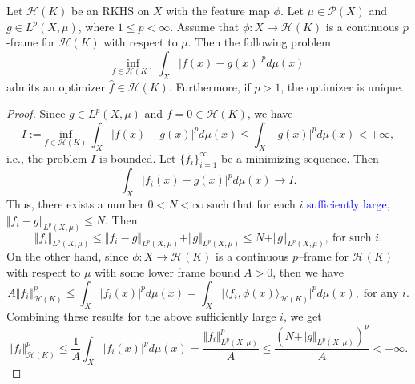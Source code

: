 \documentclass[10pt,a4paper]{amsart}
\begin{document}
\begin{theorem} \label{pexistance} 
  Let $\mathscr{H}(K)$ be an RKHS on $X$ with the feature map $\phi$.  
  Let $\mu \in \mathscr{P}(X)$ and $g \in L^p(X,\mu)$, where $1 \leq p<\infty$.
  Assume that $\phi: X \rightarrow \mathscr{H}(K)$ is a continuous $p$-frame for $\mathscr{H}(K)$ with respect to $\mu$. 
  Then the following problem 
    \begin{equation*}\label{muPNorm}
    \underset{f \in \mathscr{H}(K)}{\text{inf}} \ \int_{X} \vert f(x) - g(x) \vert ^p d\mu(x)
\end{equation*}
admits an optimizer $\hat{f} \in \mathscr{H}(K)$. Furthermore, if $p>1$, 
the optimizer is unique.
\end{theorem}

\begin{proof}
Since $g \in L^p(X,\mu)$ and $f=0 \in \mathscr{H}(K)$, we have 
 \begin{equation*}
   I:= \underset{f \in \mathscr{H}(K)}{\text{inf}} \ \int_{X} \vert f(x) - g(x) \vert ^p d\mu(x) \leq \int_{X} \vert g(x) \vert ^p d\mu(x)  < + \infty ,
\end{equation*}
i.e., the problem $I$ is bounded.
Let $\{f_i\}_{i=1}^{\infty}$ be a minimizing sequence. Then
\begin{equation*}
    \int_{X} \vert f_i(x) - g(x) \vert ^p d\mu(x) \rightarrow I.
\end{equation*}
Thus, there exists a number $0<N< \infty$ such that for each $i$ \textcolor{blue}{sufficiently large}, $ \Vert f_i - g \Vert_{L^p(X,\mu)} \leq  N$.
Then
\begin{equation*}
    \Vert f_i \Vert_{L^p(X,\mu)} \leq \Vert f_i - g \Vert_{L^p(X,\mu)} + \Vert g \Vert_{L^p(X,\mu)} \leq  N + \Vert g \Vert_{L^p(X,\mu)}, \ \text{for such $i$}.
\end{equation*}
On the other hand, since $\phi: X \rightarrow \mathscr{H}(K)$ is a continuous $p$--frame for $\mathscr{H}(K)$ with respect to $\mu$ with some lower frame bound $A>0$, then we have
\begin{equation*}
    A \Vert f_i \Vert_{\mathscr{H}(K)}^p \leq \int_{X} \vert f_i(x) \vert ^p d\mu(x) = \int_{X} \vert \langle f_i, \phi(x) \rangle_{\mathscr{H}(K)} \vert ^p d\mu(x), \;\text{for any $i$.}
\end{equation*}
Combining these results for the above sufficiently large $i$, we get
\begin{equation*}
     \Vert f_i \Vert_{\mathscr{H}(K)}^p \leq \frac{1}{A} \int_{X} \vert f_i(x) \vert ^p d\mu(x)  =  \frac{ \Vert f_i \Vert_{L^p(X,\mu)}^p}{A} \leq \frac{(N + \Vert g \Vert_{L^p(X,\mu)})^p}{A} < + \infty.

\end{equation*}
\end{proof}
\end{document}
